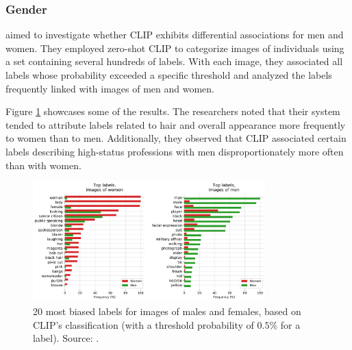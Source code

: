 \documentclass{article}
\begin{document}
\subsubsection{Gender}
\label{subsec:biases-gender}

\medskip
\noindent
\citet{radford2021clip} aimed to investigate whether CLIP exhibits differential associations for men and women. They employed zero-shot CLIP to categorize images of individuals using a set containing several hundreds of labels. With each image, they associated all labels whose probability exceeded a specific threshold and analyzed the labels frequently linked with images of men and women.

\medskip
\noindent
Figure \ref{fig:clip_fig18} showcases some of the results. The researchers noted that their system tended to attribute labels related to hair and overall appearance more frequently to women than to men. Additionally, they observed that CLIP associated certain labels describing high-status professions with men disproportionately more often than with women.

\begin{figure}[ht!]
    \begin{center}
        \includegraphics[width=0.8\textwidth]{figures/clip_fig18.png}
    \end{center}
    \caption{
        20 most biased labels for images of males and females, based on CLIP's classification (with a threshold probability of $0.5\%$ for a label). Source: \citet{radford2021clip}.
    }
    \label{fig:clip_fig18}
\end{figure}
\end{document}

